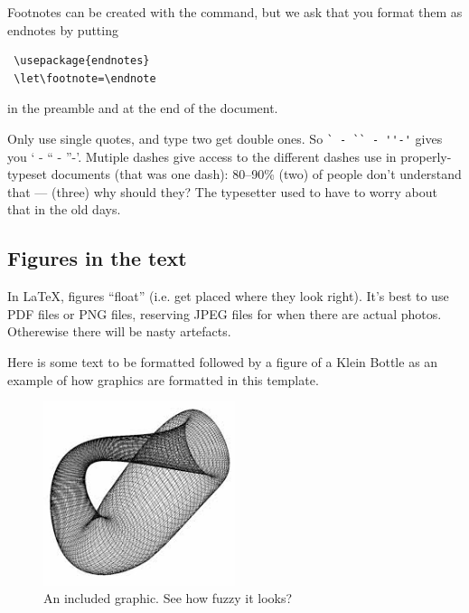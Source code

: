 \documentclass{SMR}
\begin{document}

Footnotes can be created with the  command, but we ask that
you format them as endnotes by putting
\begin{verbatim}
 \usepackage{endnotes}
 \let\footnote=\endnote
\end{verbatim}
in the preamble and  at the end of the document.

Only use single quotes, and type two get double ones. So
\verb!` - `` - ''-'! gives you ` - `` - ''-'. Mutiple dashes
give access to the different dashes use in properly-typeset documents
(that was one dash): 80--90\% (two) of people don't understand that
--- (three) why should they? The typesetter used to have to worry about that
in the old days.

\subsection{Figures in the text}

In \LaTeX, figures ``float'' (i.e. get placed where they look right).
It's best to use PDF files or PNG files, reserving JPEG files
for when there are actual photos. Otherewise there will be nasty artefacts.

Here is some text to be formatted followed by a figure of
a Klein Bottle as an example of how graphics are formatted
in this template.
\begin{figure}[h]
\caption{An included graphic. See how fuzzy it looks?}
\label{f:graphicexample} %
\centering
\includegraphics[width=0.5\textwidth]{klein.jpg}
\end{figure}
\end{document}
